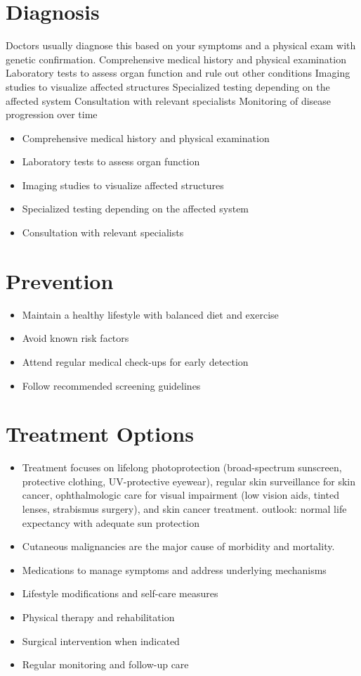 \section{Diagnosis}
Doctors usually diagnose this based on your symptoms and a physical exam with genetic confirmation. Comprehensive medical history and physical examination Laboratory tests to assess organ function and rule out other conditions Imaging studies to visualize affected structures Specialized testing depending on the affected system Consultation with relevant specialists Monitoring of disease progression over time

\begin{itemize}[noitemsep]
  \item Comprehensive medical history and physical examination
  \item Laboratory tests to assess organ function
  \item Imaging studies to visualize affected structures
  \item Specialized testing depending on the affected system
  \item Consultation with relevant specialists
\end{itemize}
\section{Prevention}
\begin{itemize}[noitemsep]
  \item Maintain a healthy lifestyle with balanced diet and exercise
  \item Avoid known risk factors
  \item Attend regular medical check-ups for early detection
  \item Follow recommended screening guidelines
\end{itemize}
\section{Treatment Options}
\begin{itemize}[noitemsep]
  \item Treatment focuses on lifelong photoprotection (broad-spectrum sunscreen, protective clothing, UV-protective eyewear), regular skin surveillance for skin cancer, ophthalmologic care for visual impairment (low vision aids, tinted lenses, strabismus surgery), and skin cancer treatment. outlook: normal life expectancy with adequate sun protection
  \item Cutaneous malignancies are the major cause of morbidity and mortality.
  \item Medications to manage symptoms and address underlying mechanisms
  \item Lifestyle modifications and self-care measures
  \item Physical therapy and rehabilitation
  \item Surgical intervention when indicated
  \item Regular monitoring and follow-up care
\end{itemize}
